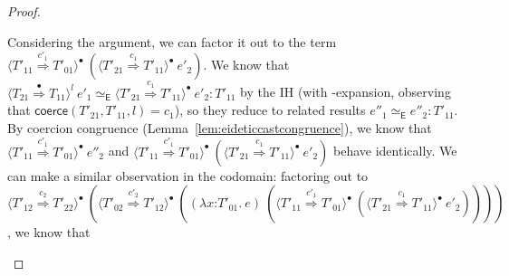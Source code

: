 \documentclass[9pt]{extarticle}
\newcommand{\ottnt}[1]{\mathit{#1}}
\newcommand{\ottsym}[1]{#1}
\begin{document}
\begin{lemma}
\begin{proof}
{\begin{itemize}
\begin{itemize}
        Considering the argument, we can factor it out to the term
        $ \langle  \ottnt{T'_{{\mathrm{11}}}}  \mathord{ \overset{ \ottnt{c'_{{\mathrm{1}}}} }{\Rightarrow} }  \ottnt{T'_{{\mathrm{01}}}}  \rangle^{\bullet} ~   (  \langle  \ottnt{T'_{{\mathrm{21}}}}  \mathord{ \overset{ \ottnt{c_{{\mathrm{1}}}} }{\Rightarrow} }  \ottnt{T'_{{\mathrm{11}}}}  \rangle^{\bullet} ~  \ottnt{e'_{{\mathrm{2}}}}  )  $. We know that
        $  \langle  \ottnt{T_{{\mathrm{21}}}}  \mathord{ \overset{\bullet}{\Rightarrow} }  \ottnt{T_{{\mathrm{11}}}}  \rangle^{ \ottnt{l} } ~  \ottnt{e'_{{\mathrm{1}}}}    \simeq _{  \mathsf{E}  }   \langle  \ottnt{T'_{{\mathrm{21}}}}  \mathord{ \overset{ \ottnt{c_{{\mathrm{1}}}} }{\Rightarrow} }  \ottnt{T'_{{\mathrm{11}}}}  \rangle^{\bullet} ~  \ottnt{e'_{{\mathrm{2}}}}   :  \ottnt{T'_{{\mathrm{11}}}} $ by the IH
        (with -expansion, observing that
        $ \mathsf{coerce} ( \ottnt{T'_{{\mathrm{21}}}} , \ottnt{T'_{{\mathrm{11}}}} , \ottnt{l} )   \ottsym{=}  \ottnt{c_{{\mathrm{1}}}}$), so they reduce to related
        results $ \ottnt{e''_{{\mathrm{1}}}}   \simeq _{  \mathsf{E}  }  \ottnt{e''_{{\mathrm{2}}}}  :  \ottnt{T'_{{\mathrm{11}}}} $. By coercion congruence
        (Lemma~\ref{lem:eideticcastcongruence}), we know that
        $ \langle  \ottnt{T'_{{\mathrm{11}}}}  \mathord{ \overset{ \ottnt{c'_{{\mathrm{1}}}} }{\Rightarrow} }  \ottnt{T'_{{\mathrm{01}}}}  \rangle^{\bullet} ~  \ottnt{e''_{{\mathrm{2}}}} $ and $ \langle  \ottnt{T'_{{\mathrm{11}}}}  \mathord{ \overset{ \ottnt{c'_{{\mathrm{1}}}} }{\Rightarrow} }  \ottnt{T'_{{\mathrm{01}}}}  \rangle^{\bullet} ~   (  \langle  \ottnt{T'_{{\mathrm{21}}}}  \mathord{ \overset{ \ottnt{c_{{\mathrm{1}}}} }{\Rightarrow} }  \ottnt{T'_{{\mathrm{11}}}}  \rangle^{\bullet} ~  \ottnt{e'_{{\mathrm{2}}}}  )  $ behave identically.
We can make a similar observation in the codomain: factoring
        out to $ \langle  \ottnt{T'_{{\mathrm{12}}}}  \mathord{ \overset{ \ottnt{c_{{\mathrm{2}}}} }{\Rightarrow} }  \ottnt{T'_{{\mathrm{22}}}}  \rangle^{\bullet} ~   (  \langle  \ottnt{T'_{{\mathrm{02}}}}  \mathord{ \overset{ \ottnt{c'_{{\mathrm{2}}}} }{\Rightarrow} }  \ottnt{T'_{{\mathrm{12}}}}  \rangle^{\bullet} ~   (   (  \lambda \mathit{x} \mathord{:} \ottnt{T'_{{\mathrm{01}}}} .~  \ottnt{e}  )  ~  (  \langle  \ottnt{T'_{{\mathrm{11}}}}  \mathord{ \overset{ \ottnt{c'_{{\mathrm{1}}}} }{\Rightarrow} }  \ottnt{T'_{{\mathrm{01}}}}  \rangle^{\bullet} ~   (  \langle  \ottnt{T'_{{\mathrm{21}}}}  \mathord{ \overset{ \ottnt{c_{{\mathrm{1}}}} }{\Rightarrow} }  \ottnt{T'_{{\mathrm{11}}}}  \rangle^{\bullet} ~  \ottnt{e'_{{\mathrm{2}}}}  )   )   )   )  $, we know that

\end{itemize}
\end{itemize}}
\end{proof}
\end{lemma}
\end{document}
